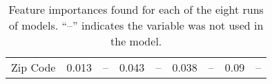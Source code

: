 \begin{table*}[]
\begin{tabular}{@{}ccccc@{\qquad}cccc@{}}
Zip Code                  & 0.013                 & --                   & 0.043                & --                     & 0.038                 & --                   & 0.09                 & --                   \\ \cmidrule(r){2-5} \cmidrule(l){7-10} 
\end{tabular}
\caption{Feature importances found for each of the eight runs of models. ``--'' indicates the variable was not used in the model.}
\label{tab:featimp}
\end{table*}